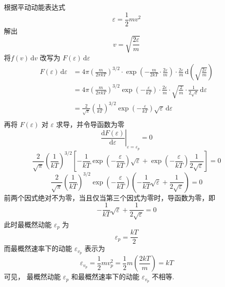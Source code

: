 \begin{solution}
    根据平动动能表达式
    $$
        \varepsilon = \frac{1}{2}mv^2
    $$
    解出
    $$
        v = \sqrt{\frac{2\varepsilon}{m}}
    $$
    将$f(v) \,\mathrm{d}v$ 改写为 $F(\varepsilon) \,\mathrm{d}\varepsilon$
    $$
        \begin{aligned}
            F(\varepsilon)\,\mathrm{d}\varepsilon
             & = 4\pi\left(\frac{m}{2\pi kT}\right)^{3/2} \cdot \exp\left(-\frac{m}{2kT} \cdot \frac{2\varepsilon}{m}\right) \cdot \frac{2\varepsilon}{m} \,\mathrm{d}\left(\sqrt{\frac{2\varepsilon}{m}}\right)      \\
             & = 4\pi\left(\frac{m}{2\pi kT}\right)^{3/2} \exp\left(-\frac{\varepsilon}{kT}\right) \cdot \frac{2\varepsilon}{m} \cdot \sqrt{\frac{2}{m}} \cdot \frac{1}{2 \sqrt{\varepsilon}} \,\mathrm{d}\varepsilon \\
             & = \frac{2}{\sqrt{\pi}}\left(\frac{1}{kT}\right)^{3/2} \exp\left(-\frac{\varepsilon}{kT}\right) \sqrt{\varepsilon} \,\mathrm{d}\varepsilon                                                              \\
        \end{aligned}
    $$
    再将 $F(\varepsilon)$ 对 $\varepsilon$ 求导，并令导函数为零
    $$
        \left. \frac{\mathrm{d}F(\varepsilon)}{\mathrm{d}\varepsilon} \right|_{\varepsilon=\varepsilon_p} = 0
    $$
    $$
        \frac{2}{\sqrt{\pi}}\left(\frac{1}{kT}\right)^{3/2} \left[ -\frac{1}{kT}\exp\left(-\frac{\varepsilon}{kT}\right) \sqrt{\varepsilon} + \exp\left(-\frac{\varepsilon}{kT}\right)\frac{1}{2\sqrt{\varepsilon}} \right] = 0
    $$
    $$
        \frac{2}{\sqrt{\pi}}\left(\frac{1}{kT}\right)^{3/2} \exp\left(-\frac{\varepsilon}{kT}\right) \left( -\frac{1}{kT}\sqrt{\varepsilon} + \frac{1}{2\sqrt{\varepsilon}} \right) = 0
    $$
    前两个因式绝对不为零，当且仅当第三个因式为零时，导函数为零，即
    $$
        -\frac{1}{kT}\sqrt{\varepsilon} + \frac{1}{2\sqrt{\varepsilon}} = 0
    $$
    此时最概然动能 $\varepsilon_p$ 为
    $$
        \varepsilon_p = \frac{kT}{2}
    $$
    而最概然速率下的动能 $\varepsilon_{v_p}$ 表示为
    $$
        \varepsilon_{v_p}
        = \frac{1}{2}mv_p^2
        = \frac{1}{2}m\left(\frac{2kT}{m}\right)
        = kT
    $$
    可见， 最概然动能 $\varepsilon_p$ 和最概然速率下的动能 $\varepsilon_{v_p}$ 不相等.
\end{solution}

